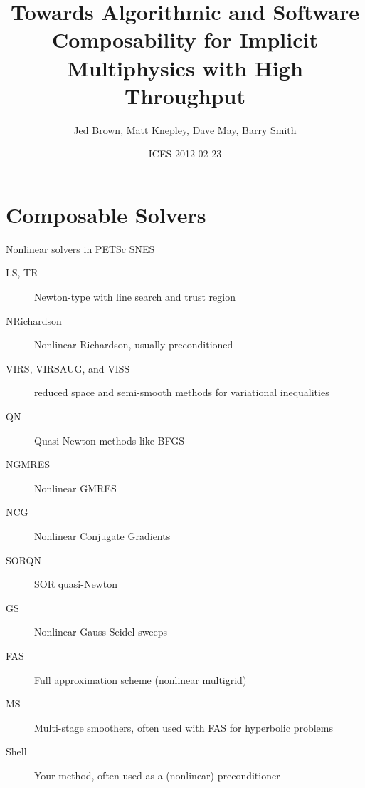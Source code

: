\documentclass{beamer}
\title{Towards Algorithmic and Software Composability for Implicit Multiphysics with High Throughput}
\author{Jed Brown\inst{1}, Matt Knepley\inst{2}, Dave May\inst{3}, Barry Smith\inst{1}}
\institute
{
  \inst{1}{Mathematics and Computer Science Division, Argonne National Laboratory} \\
  \inst{2}{Computation Institute, University of Chicago} \\
  \inst{3}{ETH Z\"urich}
}
\date{ICES 2012-02-23}
\begin{document}
\lstset{language=C}
\normalem

\begin{frame}
  \titlepage
\end{frame}

\section{Composable Solvers}








\begin{frame}{Nonlinear solvers in PETSc SNES}
  \begin{description}
  \item[LS, TR] Newton-type with line search and trust region
  \item[NRichardson] Nonlinear Richardson, usually preconditioned
  \item[VIRS, VIRSAUG, and VISS] reduced space and semi-smooth methods for variational inequalities
  \item[QN] Quasi-Newton methods like BFGS
  \item[NGMRES] Nonlinear GMRES
  \item[NCG] Nonlinear Conjugate Gradients
  \item[SORQN] SOR quasi-Newton
  \item[GS] Nonlinear Gauss-Seidel sweeps
  \item[FAS] Full approximation scheme (nonlinear multigrid)
  \item[MS] Multi-stage smoothers, often used with FAS for hyperbolic problems
  \item[Shell] Your method, often used as a (nonlinear) preconditioner
  \end{description}
\end{frame}









\end{document}
